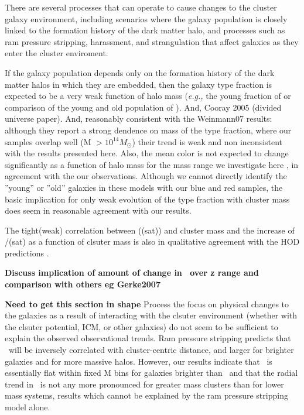\documentclass{emulateapj}
\begin{document}
There are several processes that can operate to cause changes to the cluster galaxy environment, including scenarios where the galaxy population is closely linked to the formation history of the dark matter halo, and processes such as ram pressure stripping, harassment, and strangulation that affect galaxies as they enter the cluster enviroment.


If the galaxy population depends only on the formation history of the dark matter halos in which they are embedded, then the galaxy type fraction is expected to be a very weak function of halo mass ({\it e.g.,} the young fraction of \citet{Zheng05} or comparison of the young and old population of \citet{Berlind03}). And, Cooray 2005 (divided universe paper). And, reasonably consistent with the {Weinmann07} results: although they report a strong dendence on mass of the type fraction, where our samples overlap well (M $> 10^{14} M_{\odot}$) their trend is weak and non inconsistent with the results presented here.   Also, the mean color is not expected to change significantly as a function of halo mass for the mass range we investigate here \citep{Diaferio01}, in agreement with the our observations. Although we cannot directly identify the ''young'' or ''old'' galaxies in these models with our blue and red samples, the basic implication for only weak evolution of the type fraction with cluster mass does seem in reasonable agreement with our results. 

The tight(weak) correlation between \Lbcg(\Lstar(sat)) and cluster mass and the increase of \Lbcg/\Lstar(sat) as a function of clsuter mass is also in qualitative agreement with the HOD predictions \citep{Berlind03}.

{\bf Discuss implication of amount of change in \fred\ over z range and comparison with others eg Gerke2007}

{\bf Need to get this section in shape}
Process the focus on physical changes to the galaxies as a result of interacting with the clsuter environment (whether with the clsuter potential, ICM, or other galaxies) do not seem to be sufficient to explain the observed observational trends. Ram pressure stripping predicts that \fred\ will be inversely correlated with cluster-centric distance, and larger for brighter galaxies and for more massive halos. However, our results indicate that \fred\ is essentially flat within fixed M bins for galaxies brighter than \Lstar\ and that the radial trend in \fred\ is not any more pronounced for greater mass clusters than for lower mass systems, results which cannot be explained by the ram pressure stripping model alone.
\end{document}
